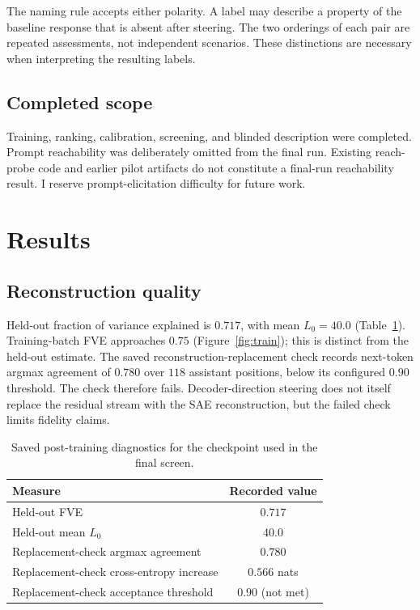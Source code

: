 \documentclass[11pt]{article}
\begin{document}
The naming rule accepts either polarity. A label may describe a property of the
baseline response that is absent after steering. The two orderings of each pair
are repeated assessments, not independent scenarios. These distinctions are
necessary when interpreting the resulting labels.

\subsection{Completed scope}
Training, ranking, calibration, screening, and blinded description were completed.
Prompt reachability was deliberately omitted from the final run. Existing
reach-probe code and earlier pilot artifacts do not constitute a final-run
reachability result. I reserve prompt-elicitation difficulty for future work.

\section{Results}
\subsection{Reconstruction quality}
Held-out fraction of variance explained is $0.717$, with mean $L_0=40.0$
(Table~\ref{tab:sae}). Training-batch FVE approaches $0.75$
(Figure~\ref{fig:train}); this is distinct from the held-out estimate. The saved
reconstruction-replacement check records next-token argmax agreement of $0.780$
over $118$ assistant positions, below its configured $0.90$ threshold. The check
therefore fails. Decoder-direction steering does not itself replace the residual
stream with the SAE reconstruction, but the failed check limits fidelity claims.

\begin{table}[htbp]\centering
\begin{tabular}{lc}
\toprule
Measure & Recorded value \\
\midrule
Held-out FVE & $0.717$ \\
Held-out mean $L_0$ & $40.0$ \\
Replacement-check argmax agreement & $0.780$ \\
Replacement-check cross-entropy increase & $0.566$ nats \\
Replacement-check acceptance threshold & $0.90$ (not met) \\
\bottomrule
\end{tabular}
\caption{Saved post-training diagnostics for the checkpoint used in the final screen.}
\label{tab:sae}
\end{table}
\end{document}
